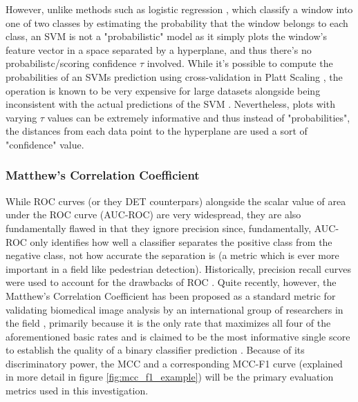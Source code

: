 However, unlike methods such as logistic regression \cite{cornell_log_regression_notes}, which classify a window into one of two classes by estimating the probability that the window belongs to each class, an SVM is not a "probabilistic" model as it simply plots the window's feature vector in a space separated by a hyperplane, and thus there's no probabilistc/scoring confidence $\tau$ involved. While it's possible to compute the probabilities of an SVMs prediction using cross-validation in Platt Scaling \cite{platt1999probabilistic}, the operation is known to be very expensive for large datasets \cite{scikit-learn_svm} alongside being inconsistent with the actual predictions of the SVM \cite{scikit-learn_svm}. Nevertheless, plots with varying $\tau$ values can be extremely informative \cite{martin1997det} \cite{scikit-learn_svm} and thus instead of "probabilities", the distances from each data point to the hyperplane are used a sort of "confidence" value.

\subsubsection{Matthew's Correlation Coefficient}

While ROC curves (or they DET counterpars) alongside the scalar value of area under the ROC curve (AUC-ROC) are very widespread, they are also fundamentally flawed in that they ignore precision since, fundamentally, AUC-ROC only identifies how well a classifier separates the positive class from the negative class, not how accurate the separation is (a metric which is ever more important in a field like pedestrian detection). Historically, precision recall curves were used to account for the drawbacks of ROC \cite{chicco_jurman_2020_mcc_f1}. Quite recently, however, the Matthew's Correlation Coefficient has been proposed as a standard metric for validating biomedical image analysis by an international group of researchers in the field \cite{Maier_Hein_2024_mcc_proposal}, primarily because it is the only rate that maximizes all four of the aforementioned basic rates \cite{Maier_Hein_2024_mcc_proposal} \cite{chicco_eval_2023} \cite{chicco_jurman_2020_mcc_f1} and is claimed to be the most informative single score to establish the quality of a binary classifier prediction \cite{chicco_eval_2023}. Because of its discriminatory power, the MCC and a corresponding MCC-F1 curve (explained in more detail in figure \ref{fig:mcc_f1_example}) will be the primary evaluation metrics used in this investigation. 

